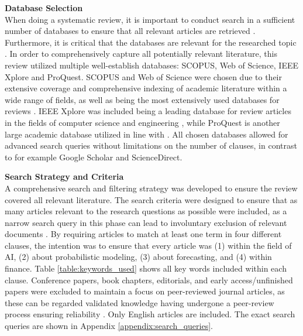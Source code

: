 \textbf{Database Selection} \\
When doing a systematic review, it is important to conduct search in a sufficient number of databases to ensure that all relevant articles are retrieved \parencite{hiebl_2021}. Furthermore, it is critical that the databases are relevant for the researched topic \parencite{marzi_et_al_2024}. In order to comprehensively capture all potentially relevant literature, this review utilized multiple well-establish databases: SCOPUS, Web of Science, IEEE Xplore and ProQuest. SCOPUS and Web of Science were chosen due to their extensive coverage and comprehensive indexing of academic literature within a wide range of fields, as well as being the most extensively used databases for reviews \parencite{marzi_et_al_2024}. IEEE Xplore was included being a leading database for review articles in the fields of computer science and engineering \parencite{suhaimi2020systematic, carvalho2019systematic, cavacini2015best}, while ProQuest is another large academic database utilized in line with \textcite{gunnarsson2024}. All chosen databases allowed for advanced search queries without limitations on the number of clauses, in contrast to for example Google Scholar and ScienceDirect. 

\textbf{Search Strategy and Criteria} \\
A comprehensive search and filtering strategy was developed to ensure the review covered all relevant literature. The search criteria were designed to ensure that as many articles relevant to the research questions as possible were included, as a narrow search query in this phase can lead to involuntary exclusion of relevant documents \parencite{marzi_et_al_2024,kuhrmann2017pragmatic, williams2021reexamining}. By requiring articles to match at least one term in four different clauses, the intention was to ensure that every article was (1) within the field of AI, (2) about probabilistic modeling, (3) about forecasting, and (4) within finance. Table \ref{table:keywords_used} shows all key words included within each clause. Conference papers, book chapters, editorials, and early access/unfinished papers were excluded to maintain a focus on peer-reviewed journal articles, as these can be regarded validated knowledge having undergone a peer-review process ensuring reliability \parencite{marzi_et_al_2024, hota2022hybrid}. Only English articles are included. The exact search queries are shown in Appendix \ref{appendix:search_queries}. 

